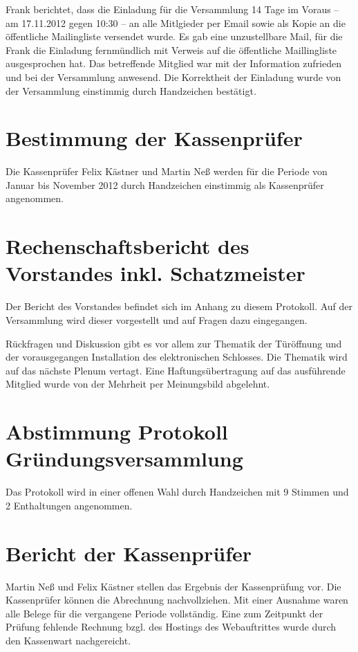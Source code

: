 \documentclass{scrartcl}
\begin{document}
Frank berichtet, dass die Einladung für die Versammlung 14 Tage im
Voraus -- am 17.11.2012 gegen 10:30 -- an alle Mitlgieder per Email
sowie als Kopie an die öffentliche Mailingliste versendet wurde. Es gab
eine unzustellbare Mail, für die Frank die Einladung fernmündlich mit
Verweis auf die öffentliche Maillingliste ausgesprochen hat. Das
betreffende Mitglied war mit der Information zufrieden und bei der
Versammlung anwesend. Die Korrektheit der Einladung wurde von der
Versammlung einstimmig durch Handzeichen bestätigt.

\section{Bestimmung der Kassenprüfer}

Die Kassenprüfer Felix Kästner und Martin Neß werden für die Periode von
Januar bis November 2012 durch Handzeichen einstimmig als Kassenprüfer
angenommen.

\section{Rechenschaftsbericht des Vorstandes inkl. Schatzmeister}
Der Bericht des Vorstandes befindet sich im Anhang zu diesem Protokoll.
Auf der Versammlung wird dieser vorgestellt und auf Fragen dazu
eingegangen.

Rückfragen und Diskussion gibt es vor allem zur Thematik der Türöffnung
und der vorausgegangen Installation des elektronischen Schlosses.
Die Thematik wird auf das nächste Plenum vertagt.
Eine Haftungsübertragung auf das ausführende Mitglied wurde von der
Mehrheit per Meinungsbild abgelehnt.

\section{Abstimmung Protokoll Gründungsversammlung}
Das Protokoll wird in einer offenen Wahl durch Handzeichen mit 9 Stimmen
und 2 Enthaltungen angenommen.

\section{Bericht der Kassenprüfer}
Martin Neß und Felix Kästner stellen das Ergebnis der Kassenprüfung vor.
Die Kassenprüfer können die Abrechnung nachvollziehen. Mit einer
Ausnahme waren alle Belege für die vergangene Periode vollständig. Eine
zum Zeitpunkt der Prüfung fehlende Rechnung bzgl. des Hostings des
Webauftrittes wurde durch den Kassenwart nachgereicht.
\end{document}
